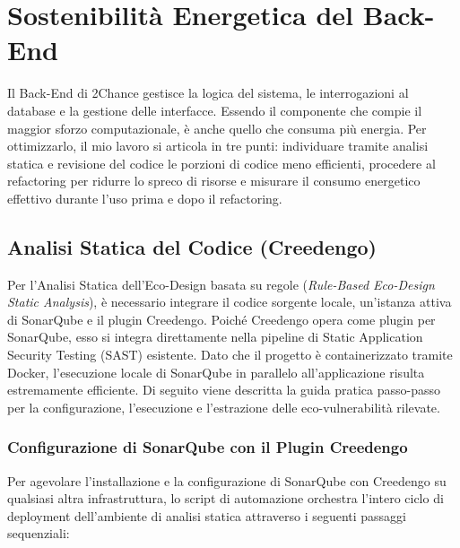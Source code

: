 \chapter{Sostenibilità Energetica del Back-End}

Il Back-End di 2Chance gestisce la logica del sistema, le interrogazioni al database e la gestione delle interfacce. Essendo il componente che compie il maggior sforzo computazionale, è anche quello che consuma più energia. Per ottimizzarlo, il mio lavoro si articola in tre punti: individuare tramite analisi statica e revisione del codice le porzioni di codice meno efficienti, procedere al refactoring per ridurre lo spreco di risorse e misurare il consumo energetico effettivo durante l'uso prima e dopo il refactoring.

\section{Analisi Statica del Codice (Creedengo)}

Per l'Analisi Statica dell'Eco-Design basata su regole (\textit{Rule-Based Eco-Design Static Analysis}), è necessario integrare il codice sorgente locale, un'istanza attiva di SonarQube e il plugin Creedengo. Poiché Creedengo opera come plugin per SonarQube, esso si integra direttamente nella pipeline di Static Application Security Testing (SAST) esistente. Dato che il progetto è containerizzato tramite Docker, l'esecuzione locale di SonarQube in parallelo all'applicazione risulta estremamente efficiente. Di seguito viene descritta la guida pratica passo-passo per la configurazione, l'esecuzione e l'estrazione delle eco-vulnerabilità rilevate.

\subsection{Configurazione di SonarQube con il Plugin Creedengo}

Per agevolare l'installazione e la configurazione di SonarQube con Creedengo su qualsiasi altra infrastruttura, lo script di automazione orchestra l'intero ciclo di deployment dell'ambiente di analisi statica attraverso i seguenti passaggi sequenziali:

